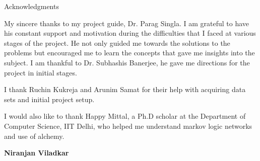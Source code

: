 \begin{center}
\LARGE{Acknowledgments} 
\end{center}

\vspace{0.5in}

My sincere thanks to my project guide, Dr. Parag Singla.
I am grateful to have his constant support and motivation
during the difficulties that I faced at various stages of the project. 
He not only guided me towards the solutions to the problems but encouraged 
me to learn the concepts that gave me insights into the subject. I am thankful 
to Dr. Subhashis Banerjee, he gave me directions for the project in initial stages.

I thank Ruchin Kukreja and Arunim Samat 
for their help with acquiring data sets and initial project setup.

I would also like to thank Happy Mittal, a Ph.D scholar at the Department of Computer Science, IIT Delhi, 
who helped me understand markov logic networks and use of alchemy.
\vspace{1.5in}

{\bfseries Niranjan Viladkar}
